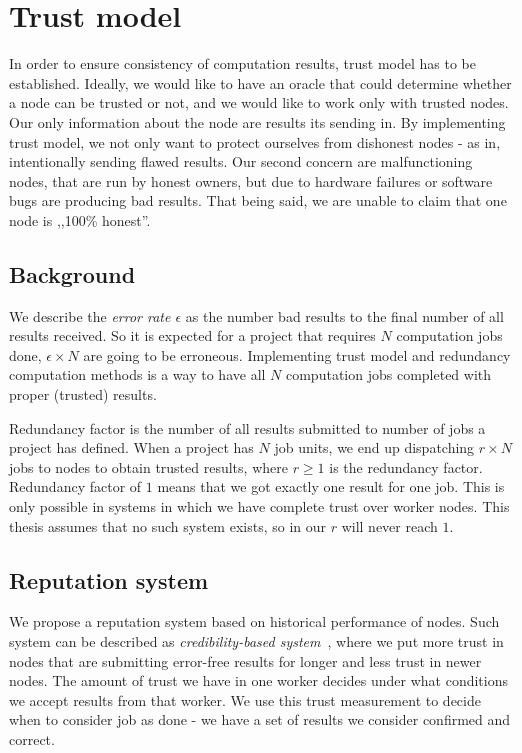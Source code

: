 \section{Trust model}
\label{sec:trust_model}

In order to ensure consistency of computation results, trust model has to be established. Ideally, we would like to have an oracle that could determine whether a node can be trusted or not, and we would like to work only with trusted nodes. Our only information about the node are results its sending in. By implementing trust model, we not only want to protect ourselves from dishonest nodes - as in, intentionally sending flawed results. Our second concern are malfunctioning nodes, that are run by honest owners, but due to hardware failures or software bugs are producing bad results. That being said, we are unable to claim that one node is ,,100\% honest''.

\subsection{Background}

We describe the \emph{error rate $\epsilon$} as the number bad results to the final number of all results received. So it is expected for a project that requires $N$ computation jobs done, $\epsilon \times N$ are going to be erroneous. Implementing trust model and redundancy computation methods is a way to have all $N$ computation jobs completed with proper (trusted) results.

Redundancy factor is the number of all results submitted to number of jobs a project has defined. When a project has $N$ job units, we end up dispatching $r \times N$ jobs to nodes to obtain trusted results, where $r \ge 1$ is the redundancy factor. Redundancy factor of $1$ means that we got exactly one result for one job. This is only possible in systems in which we have complete trust over worker nodes. This thesis assumes that no such system exists, so in our $r$ will never reach $1$.

\subsection{Reputation system}
\label{s:reputation}

We propose a reputation system based on historical performance of nodes. Such system can be described as \emph{credibility-based system}~\cite{Silaghi2009}, where we put more trust in nodes that are submitting error-free results for longer and less trust in newer nodes. The amount of trust we have in one worker decides under what conditions we accept results from that worker. We use this trust measurement to decide when to consider job as done - we have a set of results we consider confirmed and correct.

